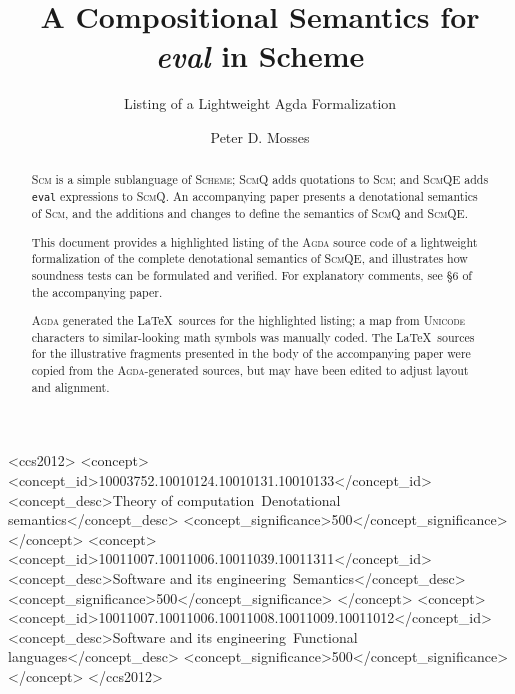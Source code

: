 \documentclass[sigplan,screen,nonacm]{acmart}
\begin{document}
\title{A Compositional Semantics for \emph{eval} in Scheme}

\subtitle{Listing of a Lightweight Agda Formalization}

\author{Peter D. Mosses}

\begin{abstract}

\textsc{Scm} is a simple sublanguage of \textsc{Scheme};
\textsc{ScmQ} adds quotations to \textsc{Scm}; and
\textsc{ScmQE} adds \texttt{eval} expressions to \textsc{ScmQ}.
An accompanying paper presents a denotational semantics of \textsc{Scm},
and the additions and changes to define the semantics of \textsc{ScmQ}
and \textsc{ScmQE}.

This document provides a highlighted listing of the \textsc{Agda} source code
of a lightweight formalization of the complete denotational semantics of
\textsc{ScmQE}, and illustrates how soundness tests can be formulated and verified.
For explanatory comments, see §6 of the accompanying paper.

\textsc{Agda} generated the \LaTeX\ sources for the highlighted listing;
a map from \textsc{Unicode} characters to similar-looking math symbols was
manually coded. The \LaTeX\ sources for the illustrative fragments presented
in the body of the accompanying paper were copied from the \textsc{Agda}-generated
sources, but may have been edited to adjust layout and alignment.

\end{abstract}

\begin{CCSXML}
<ccs2012>
   <concept>
       <concept_id>10003752.10010124.10010131.10010133</concept_id>
       <concept_desc>Theory of computation~Denotational semantics</concept_desc>
       <concept_significance>500</concept_significance>
       </concept>
  <concept>
       <concept_id>10011007.10011006.10011039.10011311</concept_id>
       <concept_desc>Software and its engineering~Semantics</concept_desc>
       <concept_significance>500</concept_significance>
       </concept>
   <concept>
       <concept_id>10011007.10011006.10011008.10011009.10011012</concept_id>
       <concept_desc>Software and its engineering~Functional languages</concept_desc>
       <concept_significance>500</concept_significance>
       </concept>
 </ccs2012>
\end{CCSXML}
\end{document}
